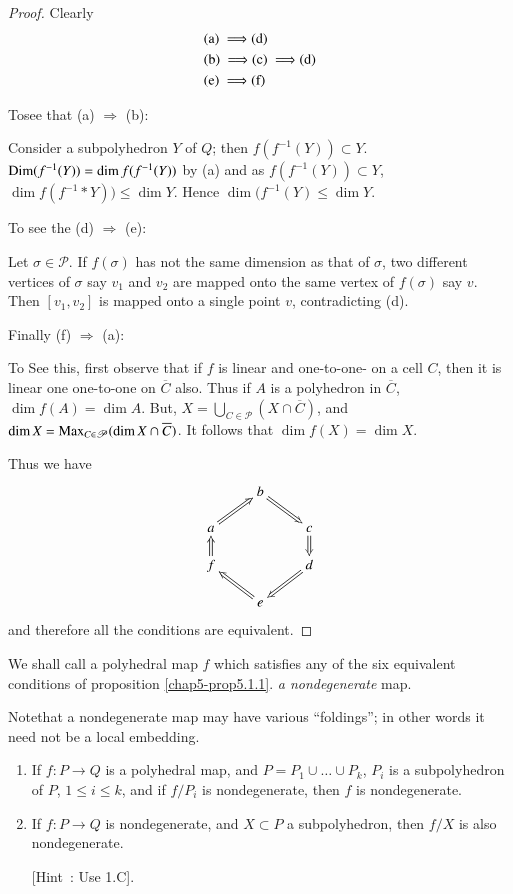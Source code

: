 \begin{proof}
Clearly
\begin{align*}
& {\rm(a)}~\Longrightarrow {\rm(d)}\\
& {\rm(b)}~\Longrightarrow {\rm(c)}~\Longrightarrow {\rm(d)}\\
& {\rm(e)}~\Longrightarrow {\rm(f)}
\end{align*}

To\pageoriginale see that (a) $\Longrightarrow$ (b):

Consider a subpolyhedron $Y$ of $Q$; then $f(f^{-1}(Y))\subset Y$.\break $\operatorname{Dim} (f^{-1}(Y))=\dim f(f^{-1}(Y))$ by (a) and as $f(f^{-1}(Y))\subset Y$, $\dim f(f^{-1}*Y))\leq \dim Y$. Hence $\dim (f^{-1}(Y)\leq \dim Y$.

To see the (d) $\Rightarrow$ (e):

Let $\sigma\in\mathscr{P}$. If $f(\sigma)$ has not the same dimension as that of $\sigma$, two different vertices of $\sigma$ say $v_{1}$ and $v_{2}$ are mapped onto the same vertex of $f(\sigma)$ say $v$. Then $[v_{1},v_{2}]$ is mapped onto a single point $v$, contradicting (d).

Finally (f) $\Rightarrow$ (a):

To See this, first observe that if $f$ is linear and one-to-one- on a cell $C$, then it is linear one one-to-one on $\overline{C}$ also. Thus if $A$ is a polyhedron in $\overline{C}$, $\dim f(A)=\dim A$. But, $X=\bigcup\limits_{C\in\mathscr{P}}(X\cap \overline{C})$, and $\dim X=\operatorname{Max}\limits_{C\in\mathscr{P}}(\dim X\cap \overline{C})$. It follows that $\dim f(X)=\dim X$.

Thus we have
\[
\xymatrix@R=.5cm{
 & b\ar@{=>}[dr] & \\
a\ar@{=>}[ur] & & c\ar@{=>}[d]\\
f\ar@{=>}[u] & & d\ar@{=>}[dl]\\
& e\ar@{=>}[ul] &
}
\]
and therefore all the conditions are equivalent.
\end{proof}

\begin{definition}\label{chap5-defi5.1.2}
We shall call a polyhedral map $f$ which satisfies any of the six equivalent conditions of proposition \ref{chap5-prop5.1.1}. {\em a nondegenerate} map. 
\end{definition}

Note\pageoriginale that a nondegenerate map may have various ``foldings''; in other words it need not be a local embedding.

\begin{ex}\label{chap5-ex5.1.3}
\begin{enumerate}
\renewcommand{\labelenumi}{(\theenumi)}
\item If $f:P\to Q$ is a polyhedral map, and $P=P_{1}\cup \ldots \cup P_{k}$, $P_{i}$ is a subpolyhedron of $P$, $1\leq i\leq k$, and if $f/P_{i}$ is nondegenerate, then $f$ is nondegenerate.

\item If $f:P\to Q$ is nondegenerate, and $X\subset P$ a subpolyhedron, then $f/X$ is also nondegenerate.

[Hint~: Use 1.C].
\end{enumerate}
\end{ex}

